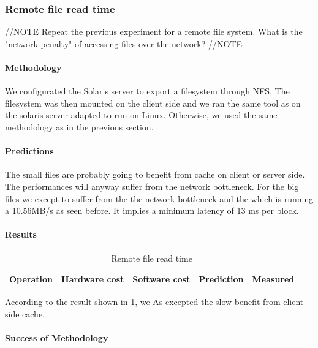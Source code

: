 \subsubsection{Remote file read time}
//NOTE
Repeat the previous experiment for a remote file system. What is the "network penalty" of accessing files over the network?
//NOTE

\paragraph{Methodology}
We configurated the Solaris server to export a filesystem through NFS.
The filesystem was then mounted on the client side and we ran the same tool as
on the solaris server adapted to run on Linux.
Otherwise, we used the same methodology as in the previous section.

\paragraph{Predictions}
The small files are probably going to benefit from cache on client or server
side.
The performances will anyway suffer from the network bottleneck.
For the big files we except to suffer from the the network bottleneck and the
which is running a 10.56MB/s as seen before.
It implies a minimum latency of 13 ms per block.

\paragraph{Results}

\begin{table}[h]
\begin{center}
\begin{tabular}{| l | l | l | l | l |}
\hline
Operation & Hardware cost & Software cost & Prediction & Measured \\
\hline
\end{tabular}
\end{center}
\caption{Remote file read time\label{tab:remote-file-access}}
\end{table}

According to the result shown in \ref{tab:remote-file-access}, we
As excepted the slow benefit from client side cache.
\paragraph{Success of Methodology}



